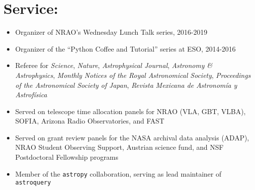 
\begin{minipage}{\textwidth}
\setlength{\extrarowheight}{4pt}
\section*{Service:}
\vspace{-10pt}
\begin{itemize}
\itemsep-3pt
        
    \item Organizer of NRAO's Wednesday Lunch Talk series, 2016-2019
    \item Organizer of the ``Python Coffee and Tutorial'' series at ESO, 2014-2016
    \item Referee for 
            \textit{Science},
            \textit{Nature},
            \textit{Astrophysical Journal},
            \textit{Astronomy \& Astrophysics},
            \textit{Monthly Notices of the Royal Astronomical Society},
            \textit{Proceedings of the Astronomical Society of Japan},
            \textit{Revista Mexicana de Astronom{\'i}a y Astrof{\'i}sica}
    \item Served on telescope time allocation panels for NRAO (VLA, GBT, VLBA), SOFIA,
        Arizona Radio Observatories, and FAST
    \item Served on grant review panels for the NASA archival data analysis (ADAP), 
        NRAO Student Observing Support,
        Austrian science fund,
        and NSF Postdoctoral Fellowship programs
    \item Member of the \texttt{astropy} collaboration, serving as lead maintainer
        of \texttt{astroquery} %
\end{itemize}
\end{minipage}
\vspace{4mm}
